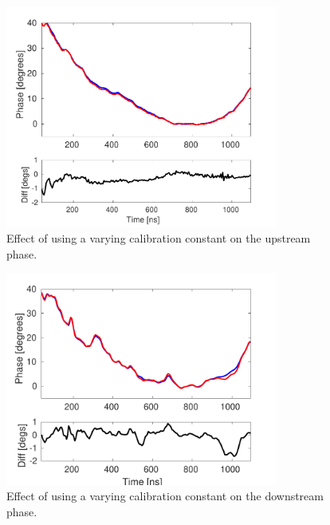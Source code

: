 \begin{figure}
  \centering
  \includegraphics[width=0.8\textwidth]{Figures/phaseMons/multiSampMon2Along}
  \caption{Effect of using a varying calibration constant on the upstream phase.}
  \label{f:multiSampMon2Along}
\end{figure}

\begin{figure}
  \centering
  \includegraphics[width=0.8\textwidth]{Figures/phaseMons/multiSampMon3Along}
  \caption{Effect of using a varying calibration constant on the downstream phase.}
  \label{f:multiSampMon3Along}
\end{figure}




